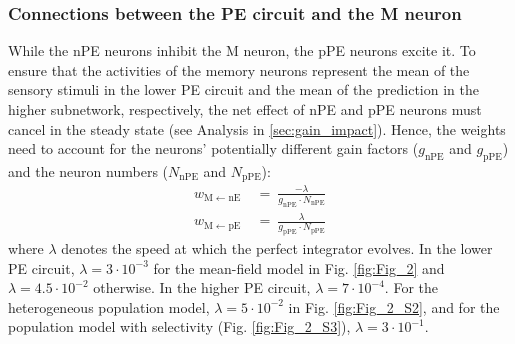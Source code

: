 \documentclass[10pt,a4paper,draft]{article}
\begin{document}
\subsubsection{Connections between the PE circuit and the M neuron}
%
While the nPE neurons inhibit the M neuron, the pPE neurons excite it. To ensure that the activities of the memory neurons represent the mean of the sensory stimuli in the lower PE circuit and the mean of the prediction in the higher subnetwork, respectively, the net effect of nPE and pPE neurons must cancel in the steady state (see Analysis in \ref{sec:gain_impact}). Hence, the weights need to account for the neurons' potentially different gain factors ($g_\mathrm{nPE}$ and $g_\mathrm{pPE}$) and the neuron numbers ($N_\mathrm{nPE}$ and $N_\mathrm{pPE}$):
%
\begin{align*}
w_\mathrm{M\leftarrow nE}\  &=\ \frac{-\lambda}{g_\mathrm{nPE} \cdot N_\mathrm{nPE}} \nonumber\\
w_\mathrm{M\leftarrow pE}\  &=\ \frac{\lambda}{g_\mathrm{pPE} \cdot N_\mathrm{pPE}}
\end{align*}
%
where $\lambda$ denotes the speed at which the perfect integrator evolves. In the lower PE circuit,  $\lambda=3\cdot 10^{-3}$ for the mean-field model in Fig. \ref{fig:Fig_2} and $\lambda=4.5\cdot 10^{-2}$ otherwise. In the higher PE circuit, $\lambda = 7\cdot 10^{-4}$. For the heterogeneous population model, $\lambda=5\cdot 10^{-2}$ in Fig. \ref{fig:Fig_2_S2}, and for the population model with selectivity (Fig. \ref{fig:Fig_2_S3}), $ \lambda=3\cdot 10^{-1}$.
\end{document}

